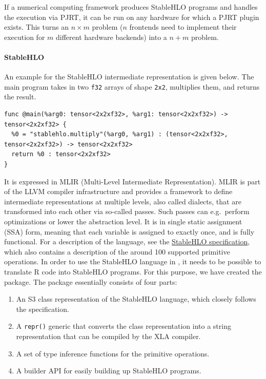 If a numerical computing framework produces StableHLO programs and handles the execution via PJRT, it can be run on any hardware for which a PJRT plugin exists.
This turns an \(n \times m\) problem (\(n\) frontends need to implement their execution for \(m\) different hardware backends) into a \(n + m\) problem.

\paragraph{StableHLO}\label{stablehlo}

An example for the StableHLO intermediate representation is given below.
The main program takes in two \texttt{f32} arrays of shape \texttt{2x2}, multiplies them, and returns the result.

\begin{verbatim}
func @main(%arg0: tensor<2x2xf32>, %arg1: tensor<2x2xf32>) -> tensor<2x2xf32> {
  %0 = "stablehlo.multiply"(%arg0, %arg1) : (tensor<2x2xf32>, tensor<2x2xf32>) -> tensor<2x2xf32>
  return %0 : tensor<2x2xf32>
}
\end{verbatim}

It is expressed in MLIR (Multi-Level Intermediate Representation).
MLIR is part of the LLVM compiler infrastructure and provides a framework to define intermediate representations at multiple levels, also called dialects, that are transformed into each other via so-called passes.
Such passes can e.g.~perform optimizations or lower the abstraction level.
It is in single static assignment (SSA) form, meaning that each variable is assigned to exactly once, and is fully functional.
For a description of the language, see the \href{https://openxla.org/stablehlo/spec}{StableHLO specification}, which also contains a description of the around 100 supported primitive operations.
In order to use the StableHLO language in , it needs to be possible to translate R code into StableHLO programs.
For this purpose, we have created the  package.
The package essentially consists of four parts:

\begin{enumerate}
\def\labelenumi{\arabic{enumi}.}
\tightlist
\item
  An S3 class representation of the StableHLO language, which closely follows the specification.
\item
  A \texttt{repr()} generic that converts the class representation into a string representation that can be compiled by the XLA compiler.
\item
  A set of type inference functions for the primitive operations.
\item
  A builder API for easily building up StableHLO programs.
\end{enumerate}

